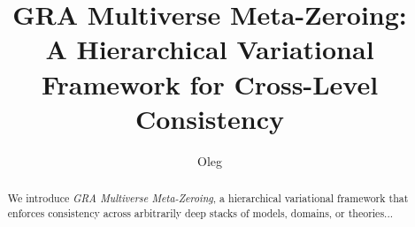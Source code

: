 \documentclass[11pt]{article}
\title{GRA Multiverse Meta-Zeroing: \\ A Hierarchical Variational Framework for Cross-Level Consistency}
\author{Oleg}
\date{}
\begin{document}
\maketitle
\begin{abstract}
We introduce \emph{GRA Multiverse Meta-Zeroing}, a hierarchical variational framework that enforces consistency across arbitrarily deep stacks of models, domains, or theories...
\end{abstract}
\end{document}
